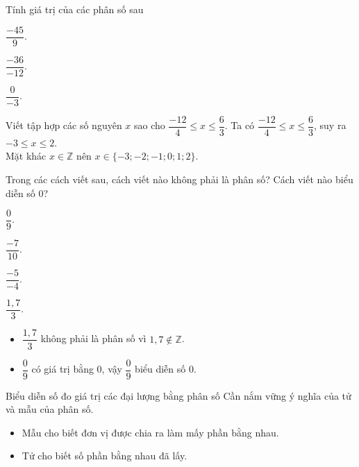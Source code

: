 \begin{vd}%
 Tính giá trị của các phân số sau
 \begin{enumEX}{3}
  \item $\dfrac{-45}{9}$.
  \item $\dfrac{-36}{-12}$.
  \item $\dfrac{0}{-3}$.
 \end{enumEX}
\end{vd}

\begin{vd}%
 Viết tập hợp các số nguyên $x$ sao cho $\dfrac{-12}{4} \leq x \leq \dfrac{6}{3}$.
 \loigiai
  {
  Ta có $\dfrac{-12}{4} \leq x \leq \dfrac{6}{3}$, suy ra $-3\leq x \leq 2$.\\
  Mặt khác $x\in \mathbb{Z}$ nên $x\in\{-3;-2;-1;0;1;2\}$.
  }
\end{vd}

\begin{vd}%
 Trong các cách viết sau, cách viết nào không phải là phân số? Cách viết nào biểu diễn số $0$?
 \begin{enumEX}{4}
  \item $\dfrac{0}{9}$.
  \item $\dfrac{-7}{10}$.
  \item $\dfrac{-5}{-4}$.
  \item $\dfrac{1{,}7}{3}$.
 \end{enumEX}
 \loigiai
  {
  \begin{itemize}
   \item $\dfrac{1{,}7}{3}$ không phải là phân số vì $1{,}7 \notin \mathbb{Z}$.
   \item $\dfrac{0}{9}$ có giá trị bằng $0$, vậy $\dfrac{0}{9}$ biểu diễn số $0$.
  \end{itemize}
  }
\end{vd}

\begin{dang}{Biểu diễn số đo giá trị các đại lượng bằng phân số}
 Cần nắm vững ý nghĩa của tử và mẫu của phân số.
 \begin{itemize}
  \item Mẫu cho biết đơn vị được chia ra làm mấy phần bằng nhau.
  \item Tử cho biết số phần bằng nhau đã lấy.
 \end{itemize}
\end{dang}

